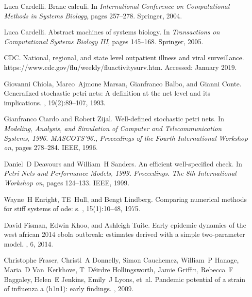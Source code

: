 \documentclass[11pt]{article}
\begin{document}
\begin{thebibliography}{10}

Luca Cardelli.
\newblock Brane calculi.
\newblock In {\em International Conference on Computational Methods in Systems
  Biology}, pages 257--278. Springer, 2004.

Luca Cardelli.
\newblock Abstract machines of systems biology.
\newblock In {\em Transactions on Computational Systems Biology III}, pages
  145--168. Springer, 2005.

CDC.
\newblock National, regional, and state level outpatient illness and viral
  surveillance.
\newblock https://www.cdc.gov/flu/weekly/fluactivitysurv.htm.
\newblock Accessed: January 2019.

Giovanni Chiola, Marco~Ajmone Marsan, Gianfranco Balbo, and Gianni Conte.
\newblock Generalized stochastic petri nets: A definition at the net level and
  its implications.
, 19(2):89--107, 1993.

Gianfranco Ciardo and Robert Zijal.
\newblock Well-defined stochastic petri nets.
\newblock In {\em Modeling, Analysis, and Simulation of Computer and
  Telecommunication Systems, 1996. MASCOTS'96., Proceedings of the Fourth
  International Workshop on}, pages 278--284. IEEE, 1996.

Daniel~D Deavours and William~H Sanders.
\newblock An efficient well-specified check.
\newblock In {\em Petri Nets and Performance Models, 1999. Proceedings. The 8th
  International Workshop on}, pages 124--133. IEEE, 1999.

Wayne~H Enright, TE~Hull, and Bengt Lindberg.
\newblock Comparing numerical methods for stiff systems of ode: s.
, 15(1):10--48, 1975.

David Fisman, Edwin Khoo, and Ashleigh Tuite.
\newblock Early epidemic dynamics of the west african 2014 ebola outbreak:
  estimates derived with a simple two-parameter model.
, 6, 2014.

Christophe Fraser, Christl~A Donnelly, Simon Cauchemez, William~P Hanage,
  Maria~D Van~Kerkhove, T~D{\'e}irdre Hollingsworth, Jamie Griffin, Rebecca~F
  Baggaley, Helen~E Jenkins, Emily~J Lyons, et~al.
\newblock Pandemic potential of a strain of influenza a (h1n1): early findings.
, 2009.


\end{thebibliography}
\end{document}
